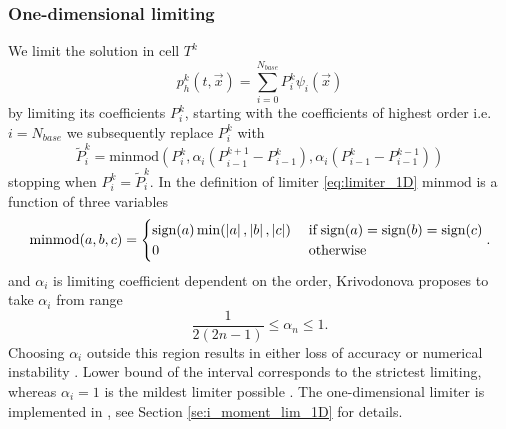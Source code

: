 \subsubsection{One-dimensional limiting}
\label{sse:moment_lim_1D}
We limit the solution in cell $T^k$
\begin{equation}
\label{eq:el_lin_comb_lim}
p_h^k(t, \vec{x}) = \sum\limits_{i=0}^{N_{base}} P_i^k\psi_i(\vec{x})
\end{equation}
by limiting its coefficients $P_i^k$, starting with the coefficients of 
highest order i.e. $i = N_{base}$ we subsequently replace 
$P_i^k$ with
\begin{equation}
\label{eq:limiter_1D}
	\tilde{P}_i^k = \text{minmod}\left(P_i^k, 
						\alpha_i(P_{i-1}^{k+1} - P_{i-1}^k), 
						\alpha_i (P_{i-1}^k - P_{i-1}^{k-1})\right)
\end{equation}
stopping when $P_i^k = \tilde{P}_i^k$. In the definition of limiter \eqref{eq:limiter_1D} 
$\text{minmod}$ is a function of three 
variables
\begin{equation}
	\text{minmod}(a,b,c) = 
	\begin{cases}
			\text{sign}(a)\min(\left\lvert a\right\rvert, \left\lvert b\right\rvert, \left\lvert c\right\rvert) & \;\text{if}\; 	
															\text{sign}(a) =
															\text{sign}(b) = 
															\text{sign}(c)\\
														0 & \;\text{otherwise}
	\end{cases}.
\end{equation}
and $\alpha_i$ is limiting coefficient dependent on the order, Krivodonova 
\cite{Krivodonova2007} proposes to take $\alpha_i$ from range
\begin{equation}
	\frac{1}{2(2n -1)} \leq \alpha_n \leq 1.
\end{equation}
Choosing $\alpha_i$ outside this region results in either loss of accuracy or numerical 
instability \cite[p. 882]{Krivodonova2007}. Lower bound of the interval corresponds to 
the strictest limiting, whereas $\alpha_i = 1$ is the mildest limiter possible \cite[p. 
882]{Krivodonova2007}. The one-dimensional limiter is implemented in 
, see Section \ref{se:i_moment_lim_1D} for details.

